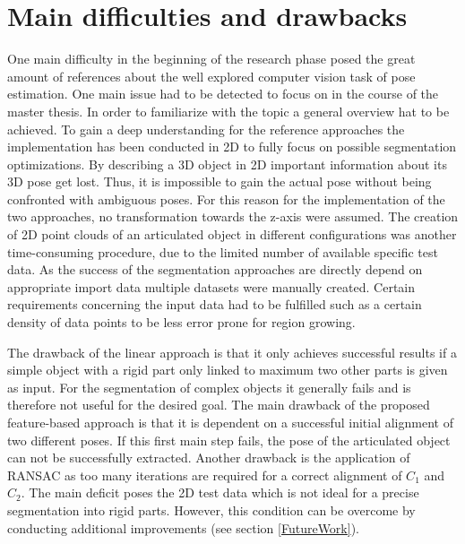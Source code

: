 
\section{Main difficulties and drawbacks}
One main difficulty in the beginning of the research phase posed the great amount of references about the well explored computer vision task of pose estimation. One main issue had to be detected to focus on in the course of the master thesis. In order to familiarize with the topic a general overview hat to be achieved. To gain a deep understanding for the reference approaches the implementation has been conducted in 2D to fully focus on possible segmentation optimizations. By describing a 3D object in 2D important information about its 3D pose get lost. Thus, it is impossible to gain the actual pose without being confronted with ambiguous poses. For this reason for the implementation of the two approaches, no transformation towards the z-axis were assumed. The creation of 2D point clouds of an articulated object in different configurations was another time-consuming procedure, due to the limited number of available specific test data. As the success of the segmentation approaches are directly depend on appropriate import data multiple datasets were manually created. Certain requirements concerning the input data had to be fulfilled such as a certain density of data points to be less error prone for region growing. 

The drawback of the linear approach is that it only achieves successful results if a simple object with a rigid part only linked to maximum two other parts is given as input. For the segmentation of complex objects it generally fails and is therefore not useful for the desired goal.
The main drawback of the proposed feature-based approach is that it is dependent on a successful initial alignment of two different poses. If this first main step fails, the pose of the articulated object can not be successfully extracted. Another drawback is the application of RANSAC as too many iterations are required for a correct alignment of $C_1$ and $C_2$. The main deficit poses the 2D test data which is not ideal for a precise segmentation into rigid parts. However, this condition can be overcome by conducting additional improvements (see section \ref{FutureWork}).
	
